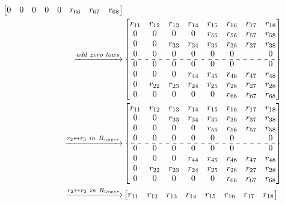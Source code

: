 \documentclass[12pt]{article}
\begin{document}
\begin{align*}
\begin{bmatrix}
 0      & 0      & 0      & 0      & 0      & r_{66} & r_{67} & r_{68}\\
\end{bmatrix}\\
\xrightarrow{add\ zero\ lows}
&\begin{bmatrix}
 r_{11} & r_{12} & r_{13} & r_{14} & r_{15} & r_{16} & r_{17} & r_{18}\\
 0      & 0      & 0      & 0      & r_{55} & r_{56} & r_{57} & r_{58}\\
 0      & 0      & r_{33} & r_{34} & r_{35} & r_{36} & r_{37} & r_{38}\\
 0      & 0      & 0      & 0      & 0      & 0      &        & 0     \\
 \cdashline{1-8}
 0      & 0      & 0      & 0      & 0      & 0      &        & 0     \\
 0      & 0      & 0      & r_{44} & r_{45} & r_{46} & r_{47} & r_{48}\\
 0      & r_{22} & r_{23} & r_{24} & r_{25} & r_{26} & r_{27} & r_{28}\\
 0      & 0      & 0      & 0      & 0      & r_{66} & r_{67} & r_{68}\\
\end{bmatrix}\\
\xrightarrow{r_{2} \leftrightarrow r_{3}\ in\ R_{upper}}
&\begin{bmatrix}
 r_{11} & r_{12} & r_{13} & r_{14} & r_{15} & r_{16} & r_{17} & r_{18}\\
 0      & 0      & r_{33} & r_{34} & r_{35} & r_{36} & r_{37} & r_{38}\\
 0      & 0      & 0      & 0      & r_{55} & r_{56} & r_{57} & r_{58}\\
 0      & 0      & 0      & 0      & 0      & 0      &        & 0     \\
 \cdashline{1-8}
 0      & 0      & 0      & 0      & 0      & 0      &        & 0     \\
 0      & 0      & 0      & r_{44} & r_{45} & r_{46} & r_{47} & r_{48}\\
 0      & r_{22} & r_{23} & r_{24} & r_{25} & r_{26} & r_{27} & r_{28}\\
 0      & 0      & 0      & 0      & 0      & r_{66} & r_{67} & r_{68}\\
\end{bmatrix} \\
\xrightarrow{r_{2} \leftrightarrow r_{3}\ in\ R_{lower}}
&\begin{bmatrix}
 r_{11} & r_{12} & r_{13} & r_{14} & r_{15} & r_{16} & r_{17} & r_{18}\\

\end{bmatrix}
\end{align*}
\end{document}
